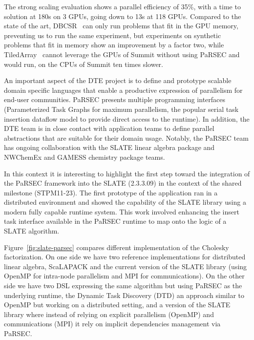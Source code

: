 The strong scaling evaluation shows a parallel efficiency of 35\%,
with a time to solution at 180s on 3 GPUs, going down to 13s at 118
GPUs.
Compared to the state of the art, DBCSR~\cite{parsec::dbcsr} can only
run problems that fit in the GPU memory, preventing us to run the same
experiment, but experiments on synthetic problems that fit in memory
show an improvement by a factor two, while
TiledArray~\cite{parsec::tiledarray} cannot leverage the GPUs of
Summit without using PaRSEC and would run, on the CPUs of Summit ten
times slower.
%
%


An important aspect of the DTE project is to define and prototype scalable
domain specific languages that enable a productive expression of parallelism for
end-user communities. PaRSEC presents multiple programming interfaces
(Parameterized Task Graphs for maximum parallelism, the popular serial task
insertion dataflow model to provide direct access to the runtime). In addition,
the DTE team is in close contact with application teams to define parallel
abstractions that are suitable for their domain usage. Notably, the PaRSEC team
has ongoing collaboration with the SLATE linear algebra package and NWChemEx and
GAMESS chemistry package teams.

In this context it is interesting to highlight the first step toward
the integration of the PaRSEC framework into the SLATE (2.3.3.09) in
the context of the shared milestone (STPM11-23). The first prototype
of the application ran in a distributed environment and showed the
capability of the SLATE library using a modern fully capable runtime
system. This work involved enhancing the insert task interface
available in the PaRSEC runtime to map onto the logic of a SLATE
algorithm.

Figure~\ref{fig:slate-parsec} compares different implementation of the
Cholesky factorization. On one side we have two reference
implementations for distributed linear algebra, ScaLAPACK and the
current version of the SLATE library (using OpenMP for intra-node
parallelism and MPI for communications). On the other side we have two
DSL expressing the same algorithm but using PaRSEC as the underlying
runtime, the Dynamic Task Discovery (DTD) an approach similar to
OpenMP but working on a distributed setting, and a version of the
SLATE library where instead of relying on explicit parallelism
(OpenMP) and communications (MPI) it rely on implicit dependencies
management via PaRSEC.


